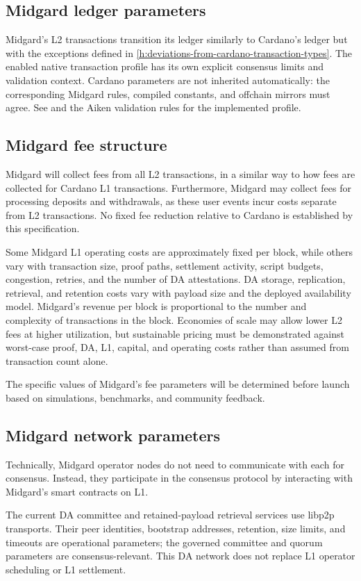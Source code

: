 \documentclass[../midgard.tex]{subfiles}
\begin{document}
\subsection{Midgard ledger parameters}
\label{h:midgard-ledger-parameters}

Midgard's L2 transactions transition its ledger similarly to Cardano's ledger but with the exceptions defined in \cref{h:deviations-from-cardano-transaction-types}.
The enabled native transaction profile has its own explicit consensus limits and validation context. Cardano parameters are not inherited automatically: the corresponding Midgard rules, compiled constants, and offchain mirrors must agree. See  and the Aiken validation rules for the implemented profile.

\subsection{Midgard fee structure}
\label{h:midgard-fee-structure}

Midgard will collect fees from all L2 transactions, in a similar way to how fees are collected for Cardano L1 transactions.
Furthermore, Midgard may collect fees for processing deposits and withdrawals, as these user events incur costs separate from L2 transactions.
No fixed fee reduction relative to Cardano is established by this specification.

Some Midgard L1 operating costs are approximately fixed per block, while others vary with transaction size, proof paths, settlement activity, script budgets, congestion, retries, and the number of DA attestations.
DA storage, replication, retrieval, and retention costs vary with payload size and the deployed availability model.
Midgard's revenue per block is proportional to the number and complexity of transactions in the block.
Economies of scale may allow lower L2 fees at higher utilization, but sustainable pricing must be demonstrated against worst-case proof, DA, L1, capital, and operating costs rather than assumed from transaction count alone.

The specific values of Midgard's fee parameters will be determined before launch based on simulations, benchmarks, and community feedback.

\subsection{Midgard network parameters}
\label{h:midgard-network-parameters}

Technically, Midgard operator nodes do not need to communicate with each for consensus.
Instead, they participate in the consensus protocol by interacting with Midgard's smart contracts on L1.

The current DA committee and retained-payload retrieval services use libp2p transports. Their peer identities, bootstrap addresses, retention, size limits, and timeouts are operational parameters; the governed committee and quorum parameters are consensus-relevant. This DA network does not replace L1 operator scheduling or L1 settlement.
\end{document}
